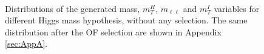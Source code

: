 \begin{figure}[htbp]
\centering
{}
\\
\caption{
    Distributions of the generated mass, $m_T^H$, $m_{\ell \ell}$ and  $m_T^I$
    variables for different Higgs mass hypothesis, without
    any selection. The same distribution after the OF selection are shown in Appendix \ref{sec:AppA}.}
    \label{fig:mt_nocuts}
\end{figure}



